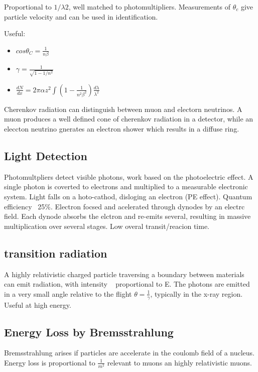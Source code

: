 \documentclass[]{article}
\begin{document}
	Proportional to $1/\lambda2$, well matched to photomultipliers. Measurements of $\theta_c$ give particle velocity and can be used in identification. 
	
	Useful:
		\begin{itemize}
			\item $cos\theta_C=\frac{1}{n\beta}$
			\item $\gamma = \frac{1}{\sqrt{1- 1/n^2}}$
			\item $\frac{dN}{dx} = 2\pi\alpha z^2 \int (1-\frac{1}{n^2\beta^2})\frac{d\lambda}{\lambda^2}$
		\end{itemize}
	
	Cherenkov radiation can distinguish between muon and electorn neutrinos. A muon produces a well defined cone of cherenkov radiation in a detector, while an eleccton neutrino gnerates an electron shower which results in a diffuse ring.
	
	\subsection{Light Detection}
	Photomultpliers detect visible photons, work based on the photoelectric effect. A single photon is coverted to electrons and multiplied to a measurable electronic system. Light falls on a hoto-cathod, disloging an electron (PE effect). Quantum efficiency ~25\%. Electron focsed and acelerated through dynodes by an electrc field. Each dynode absorbs the elctron and re-emits several, resulting in massive multiplication over several stages. Low overal transit/reacion time.
	
	\subsection{transition radiation}
	A highly relativistic charged particle traversing a boundary between materials can emit radiation, with intensity ~ proportional to E. The photons are emitted in a very small angle relative to the flight $\theta=\frac{1}{\gamma}$, typically in the x-ray region.  Useful at high energy.
	
	\subsection{Energy Loss by Bremsstrahlung}
	
	Bremsstrahlung arises if particles are accelerate in the coulomb field of a nucleus. Energy loss is proportional to $\frac{1}{m^2}$ relevant to muons an highly relativistic muons.
	
\end{document}
